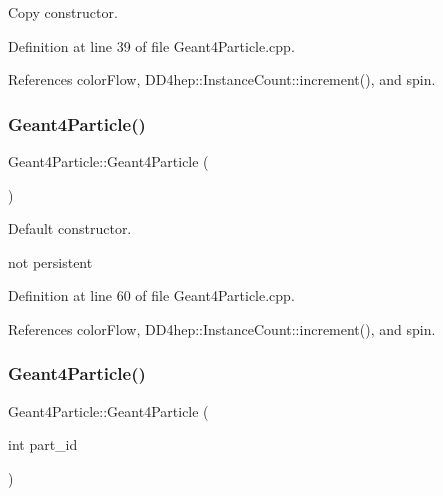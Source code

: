 Copy constructor. 



Definition at line 39 of file Geant4\+Particle.\+cpp.



References color\+Flow, D\+D4hep\+::\+Instance\+Count\+::increment(), and spin.

\hypertarget{class_d_d4hep_1_1_simulation_1_1_geant4_particle_a7fbf091b0805aeada441aa5850a8c660}{}\label{class_d_d4hep_1_1_simulation_1_1_geant4_particle_a7fbf091b0805aeada441aa5850a8c660} 
\subsubsection{\texorpdfstring{Geant4\+Particle()}{Geant4Particle()}\hspace{0.1cm}{\footnotesize\ttfamily [2/3]}}
{\footnotesize\ttfamily Geant4\+Particle\+::\+Geant4\+Particle (\begin{DoxyParamCaption}{ }\end{DoxyParamCaption})}



Default constructor. 

not persistent 

Definition at line 60 of file Geant4\+Particle.\+cpp.



References color\+Flow, D\+D4hep\+::\+Instance\+Count\+::increment(), and spin.

\hypertarget{class_d_d4hep_1_1_simulation_1_1_geant4_particle_a3fedeb9cf8f88104e7457305164145d8}{}\label{class_d_d4hep_1_1_simulation_1_1_geant4_particle_a3fedeb9cf8f88104e7457305164145d8} 
\subsubsection{\texorpdfstring{Geant4\+Particle()}{Geant4Particle()}\hspace{0.1cm}{\footnotesize\ttfamily [3/3]}}
{\footnotesize\ttfamily Geant4\+Particle\+::\+Geant4\+Particle (\begin{DoxyParamCaption}\item[{int}]{part\+\_\+id }\end{DoxyParamCaption})}



